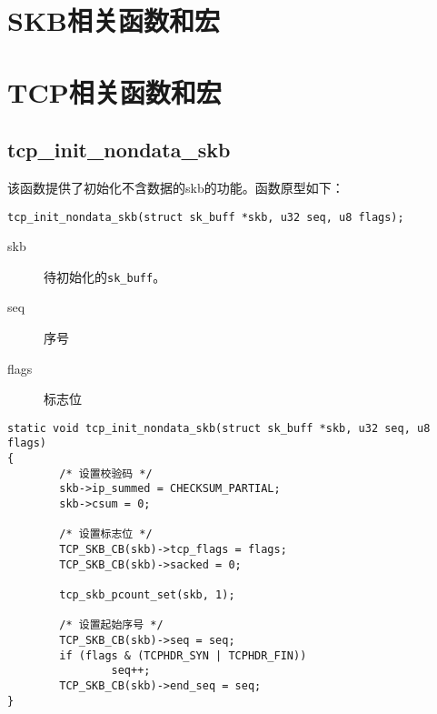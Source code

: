\documentclass[11pt, a4paper,oneside]{book}
\theoremstyle{ocrenumbox}
\theoremstyle{purplenumbox}
\theoremstyle{blackbox}
\begin{document}
\minitoc

\section{SKB相关函数和宏}

\section{TCP相关函数和宏}
\subsection{tcp\_init\_nondata\_skb}
该函数提供了初始化不含数据的skb的功能。函数原型如下：
\begin{verbatim}
tcp_init_nondata_skb(struct sk_buff *skb, u32 seq, u8 flags);
\end{verbatim}

\begin{description}
  \item[skb] 待初始化的\texttt{sk_buff}。
  \item[seq] 序号
  \item[flags] 标志位
\end{description}

\begin{verbatim}
static void tcp_init_nondata_skb(struct sk_buff *skb, u32 seq, u8 flags)
{
        /* 设置校验码 */
        skb->ip_summed = CHECKSUM_PARTIAL;
        skb->csum = 0;

        /* 设置标志位 */
        TCP_SKB_CB(skb)->tcp_flags = flags;
        TCP_SKB_CB(skb)->sacked = 0;

        tcp_skb_pcount_set(skb, 1);

        /* 设置起始序号 */
        TCP_SKB_CB(skb)->seq = seq;
        if (flags & (TCPHDR_SYN | TCPHDR_FIN))
                seq++;
        TCP_SKB_CB(skb)->end_seq = seq;
}
\end{verbatim}
\end{document}
